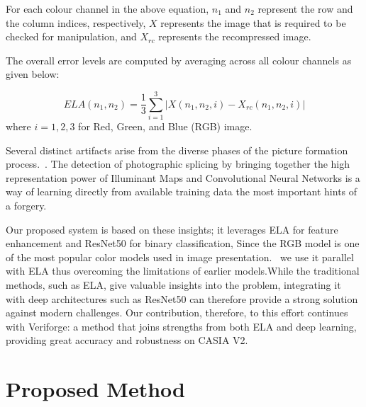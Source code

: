 \documentclass{ieeeaccess}
\begin{document}
For each colour channel in the above equation, \( n_1 \) and \( n_2 \) represent the row and the column indices, respectively, \( X \) represents the image that is required to be checked for manipulation, and \( X_{rc} \) represents the recompressed image.

The overall error levels are computed by averaging across all colour channels as given below:

\begin{equation}
	ELA(n_1, n_2) = \frac{1}{3} \sum_{i=1}^{3} \left| X(n_1, n_2, i) - X_{rc}(n_1, n_2, i) \right|  \tag{5}
\end{equation}
where \( i = 1, 2, 3 \) for Red, Green, and Blue (RGB) image.

 Several distinct artifacts arise from the diverse phases of the picture formation process.~\cite{10688184}. The detection of photographic splicing by bringing together the high representation power of Illuminant Maps and Convolutional Neural Networks is a way of learning directly from available training data the most important hints of a forgery. ~\cite{8451227}


Our proposed system is based on these insights; it leverages ELA for feature enhancement and ResNet50 for binary classification, Since the RGB model is one of the most popular color models used in image presentation.~\cite{10296670} we use it parallel with ELA thus overcoming the limitations of earlier models.While the traditional methods, such as ELA, give valuable insights into the problem, integrating it with deep architectures such as ResNet50 can therefore provide a strong solution against modern challenges. Our contribution, therefore, to this effort continues with Veriforge: a method that joins strengths from both ELA and deep learning, providing great accuracy and robustness on CASIA V2.


\section{Proposed Method}
\end{document}
